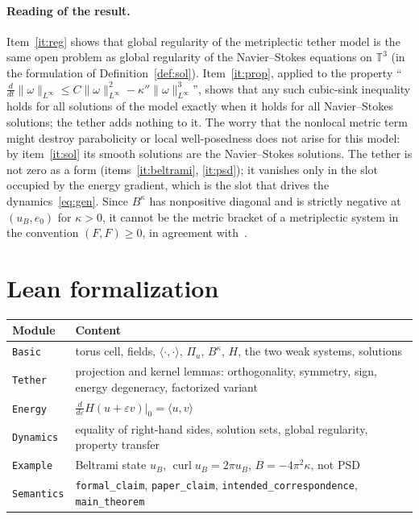 \documentclass[11pt,a4paper]{article}
\theoremstyle{definition}
\theoremstyle{remark}
\newcommand{\T}{\mathbb{T}^3}
\newcommand{\ip}[2]{\langle #1,#2\rangle}
\newcommand{\lean}[1]{\texttt{#1}}
\begin{document}
\paragraph{Reading of the result.} Item~\ref{it:reg} shows that global regularity of the
metriplectic tether model is the same open problem as global regularity of the Navier--Stokes
equations on $\T$ (in the formulation of Definition~\ref{def:sol}). Item~\ref{it:prop}, applied
to the property ``$\frac{d}{dt}\|\omega\|_{L^\infty}\le C\|\omega\|_{L^\infty}^2-\kappa''\|\omega\|_{L^\infty}^3$'', shows that any such cubic-sink inequality holds
for all solutions of the model exactly when it holds for all Navier--Stokes solutions; the tether
adds nothing to it. The worry that the nonlocal metric term might destroy parabolicity or local
well-posedness does not arise for this model: by item~\ref{it:sol} its smooth solutions are the
Navier--Stokes solutions. The tether is not zero as a form (items~\ref{it:beltrami},
\ref{it:psd}); it vanishes only in the slot occupied by the energy gradient, which is the slot
that drives the dynamics~\eqref{eq:gen}. Since $B^\kappa$ has nonpositive diagonal and is
strictly negative at $(u_B,e_0)$ for $\kappa>0$, it cannot be the metric bracket of a metriplectic
system in the convention $(F,F)\ge0$, in agreement with~\cite{Fr24122008}.

\section{Lean formalization}

\begin{center}\small
\begin{tabular}{@{}p{}p{}@{}}
\toprule
Module & Content\\
\midrule
\lean{Basic} & torus cell, fields, $\ip\cdot\cdot$, $\Pi_u$, $B^\kappa$, $H$, the two weak systems, solutions\\
\lean{Tether} & projection and kernel lemmas: orthogonality, symmetry, sign, energy degeneracy, factorized variant\\
\lean{Energy} & $\frac{d}{d\varepsilon}H(u+\varepsilon v)|_0=\ip uv$\\
\lean{Dynamics} & equality of right-hand sides, solution sets, global regularity, property transfer\\
\lean{Example} & Beltrami state $u_B$, $\operatorname{curl}u_B=2\pi u_B$, $B=-4\pi^2\kappa$, not PSD\\
\lean{Semantics} & \lean{formal\_claim}, \lean{paper\_claim}, \lean{intended\_correspondence}, \lean{main\_theorem}\\
\bottomrule
\end{tabular}
\end{center}
\end{document}
